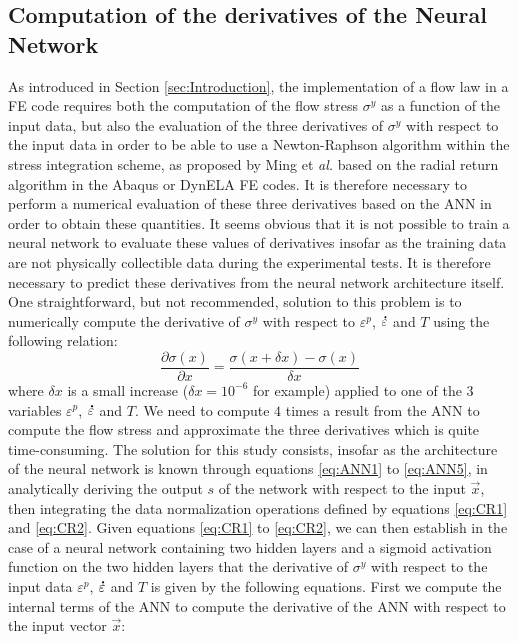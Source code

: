 \documentclass[algorithms,article,submit,pdftex,moreauthors]{Definitions/mdpi}
\makeatletter
\DeclareRobustCommand{\mdot}[1]{\accentset{\mbox{\bfseries .}}{#1}}
\DeclareRobustCommand{\eal}{et \emph{al.}\@\xspace}
\makeatother
\begin{document}
\subsection{Computation of the derivatives of the Neural Network}\label{sec:ANN-derivative}

As introduced in Section \ref{sec:Introduction}, the implementation of a flow law in a FE code requires both the computation of the flow stress $\sigma^y$ as a function of the input data, but also the evaluation of the three derivatives of $\sigma^y$ with respect to the input data in order to be able to use a Newton-Raphson algorithm within the stress integration scheme, as proposed by Ming \eal \cite{Ming-2018-ERV, Liang-2022} based on the radial return algorithm in the Abaqus or DynELA FE codes.
It is therefore necessary to perform a numerical evaluation of these three derivatives based on the ANN in order to obtain these quantities.
It seems obvious that it is not possible to train a neural network to evaluate these values of derivatives insofar as the training data are not physically collectible data during the experimental tests.
It is therefore necessary to predict these derivatives from the neural network architecture itself.
One straightforward, but not recommended, solution to this problem is to numerically compute the derivative of $\sigma^y$ with respect to $\varepsilon^p$, $\mdot\varepsilon$ and $T$ using the following relation:
\begin{equation}
\frac{\partial \sigma(x)}{\partial x} = \frac{\sigma(x+\delta x) - \sigma(x)}{\delta x}
\end{equation}
where $\delta x$ is a small increase ($\delta x=10^{-6}$ for example) applied to one of the $3$ variables $\varepsilon^p$, $\mdot\varepsilon$ and $T$.
We need to compute $4$ times a result from the ANN to compute the flow stress and approximate the three derivatives which is quite time-consuming.
The solution for this study consists, insofar as the architecture of the neural network is known through equations \ref{eq:ANN1} to \ref{eq:ANN5}, in analytically deriving the output $s$ of the network with respect to the input $\overrightarrow{x}$, then integrating the data normalization operations defined by equations \ref{eq:CR1} and \ref{eq:CR2}.
Given equations \ref{eq:CR1} to \ref{eq:CR2}, we can then establish in the case of a neural network containing two hidden layers and a sigmoid activation function on the two hidden layers that the derivative of $\sigma^y$ with respect to the input data $\varepsilon^p$, $\mdot\varepsilon$ and $T$ is given by the following equations. First we compute the internal terms of the ANN to compute the derivative of the ANN with respect to the input vector $\overrightarrow{x}$:
\end{document}
